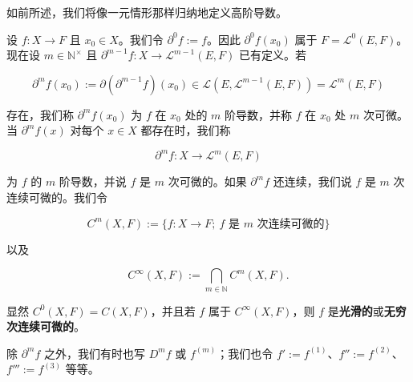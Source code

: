 如前所述，我们将像一元情形那样归纳地定义高阶导数。

设 $ f : X \to F $ 且 $ x_{0} \in X $。我们令 $ \partial^{0}f := f $。因此 $ \partial^{0}f(x_{0}) $ 属于 $ F = \mathcal{L}^{0}(E, F) $。现在设 $ m \in \mathbb{N}^{\times} $ 且 $ \partial^{m-1}f : X \to \mathcal{L}^{m-1}(E, F) $ 已有定义。若

\[
\partial^{m}f(x_{0}) := \partial(\partial^{m-1}f)(x_{0}) \in \mathcal{L}\left( E, \mathcal{L}^{m-1}(E, F) \right) = \mathcal{L}^{m}(E, F)
\]

存在，我们称 $ \partial^{m}f(x_{0}) $ 为 $ f $ 在 $ x_{0} $ 处的 $ m $ 阶导数，并称 $ f $ 在 $ x_{0} $ 处 $ m $ 次可微。当 $ \partial^{m}f(x) $ 对每个 $ x \in X $ 都存在时，我们称

\[
\partial^{m}f : X \to \mathcal{L}^{m}(E, F)
\]

为 $ f $ 的 $ m $ 阶导数，并说 $ f $ 是 $ m $ 次可微的。如果 $ \partial^{m}f $ 还连续，我们说 $ f $ 是 $ m $ 次连续可微的。我们令

\[
C^{m}(X, F) := \{ f : X \to F ;\ f \text{ 是 } m\text{ 次连续可微的} \}
\]

以及

\[
C^{\infty}(X, F) := \bigcap_{m \in \mathbb{N}}C^{m}(X, F) .
\]

显然 $ C^{0}(X, F) = C(X, F) $，并且若 $ f $ 属于 $ C^{\infty}(X, F) $，则 $ f $ 是\textbf{光滑的}或\textbf{无穷次连续可微的}。

除 $ \partial^{m}f $ 之外，我们有时也写 $ D^{m}f $ 或 $ f^{(m)} $；我们也令 $ f' := f^{(1)} $、$ f'' := f^{(2)} $、$ f''' := f^{(3)} $ 等等。

